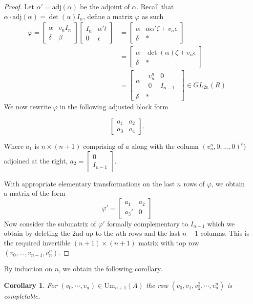 \documentclass[12pt]{article}
\numberwithin{equation}{section}
\newcounter{dummy} \numberwithin{dummy}{section}
\newtheorem{corollary}[dummy]{Corollary}
\begin{document}
\begin{proof}
	 Let $\alpha' = \text{adj}(\alpha)$ be the adjoint of $\alpha$. Recall that $\alpha \cdot \mathrm{adj}(\alpha )= \det (\alpha) I_n$, define a matrix $\varphi$ as such
		\begin{align*}
			\varphi = \begin{bmatrix} \alpha & v_nI_n \\ \delta & \beta \end{bmatrix} \begin{bmatrix} I_n & \alpha't \\ 0 & \epsilon \end{bmatrix} &= \begin{bmatrix} \alpha & \alpha \alpha' \zeta + v_n \epsilon  \\ \delta & * \end{bmatrix}\\
			&= \begin{bmatrix} \alpha & \det(\alpha) \zeta + v_n \epsilon \\ \delta & * \end{bmatrix} \\
			&= \left[ \begin{array}{c|c}
				\alpha & \begin{matrix}
					v_n^n & 0\\
					0 & I_{n-1}
				\end{matrix}\\ \hline
				\delta & *
			\end{array} \right ]\in GL_{2n}(R) 
		\end{align*}
		We now rewrite $\varphi$ in the following adjusted block form
		
		\[\begin{bmatrix} a_1 & a_2 \\ a_3 & a_4 \end{bmatrix}.\] 
		
		Where $a_1$ is $n \times (n+1)$ comprising of $a$ along with the column $(v_n^n, 0, \ldots, 0)^t$) adjoined at the right, $a_2 = \begin{bmatrix} 0 \\ I_{n-1} \end{bmatrix}$. 
		
		With appropriate elementary transformations on the last $n$ rows of $\varphi$, we obtain a matrix of the form
		\[\varphi' = \begin{bmatrix} a_1 & a_2 \\ a_3' & 0 \end{bmatrix}\]
		Now consider the submatrix of $\varphi'$ formally complementary to $I_{n-1}$ which we obtain by deleting the $2$nd up to the $n$th rows and the last $n-1$ columns. This is the required invertible $(n+1) \times (n+1)$ matrix with top row $(v_0,\ldots,v_{n-1},v_n^n)$.

		
	\end{proof}
	By induction on $n$, we obtain the following corollary.
	\begin{corollary}\label{corprefactorial}
		For $(v_0, \cdots, v_n) \in \mathrm{Um}_{n+1}(A)$ the row $(v_0, v_1, v_2^2, \cdots, v_n^n)$ is completable.
	\end{corollary}
	
\end{document}
